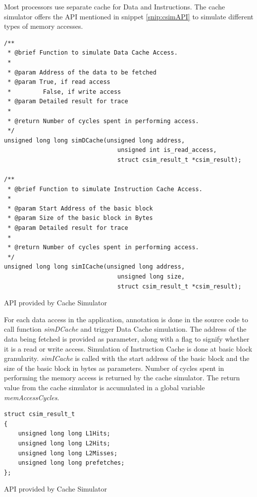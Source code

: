 Most processors use separate cache for Data and Instructions. The cache simulator offers the API mentioned in snippet \ref{snip:csimAPI} to simulate different types of memory accesses.

\vspace*{10pt}
\begin{Snippet}[h]
\begin{lstlisting}[numbers=none]
/**
 * @brief Function to simulate Data Cache Access.
 *
 * @param Address of the data to be fetched
 * @param True, if read access
 *         False, if write access
 * @param Detailed result for trace
 *
 * @return Number of cycles spent in performing access.
 */
unsigned long long simDCache(unsigned long address,
                                unsigned int is_read_access,
                                struct csim_result_t *csim_result);
                                
/**
 * @brief Function to simulate Instruction Cache Access.
 *
 * @param Start Address of the basic block
 * @param Size of the basic block in Bytes
 * @param Detailed result for trace 
 *
 * @return Number of cycles spent in performing access.
 */
unsigned long long simICache(unsigned long address,
                                unsigned long size,
                                struct csim_result_t *csim_result);
\end{lstlisting}
\caption{API provided by Cache Simulator}
\label{snip:csimAPI}
\end{Snippet}

For each data access in the application, annotation is done in the source code to call function \emph{simDCache} and trigger Data Cache simulation. The address of the data being fetched is provided as parameter, along with a flag to signify whether it is a read or write access. Simulation of Instruction Cache is done at basic block granularity. \emph{simICache} is called with the start address of the basic block and the size of the basic block in bytes as parameters. Number of cycles spent in performing the memory access is returned by the cache simulator. The return value from the cache simulator is accumulated in a global variable \emph{memAccessCycles}. 

\vspace*{10pt}
\begin{Snippet}[h]
\begin{lstlisting}[numbers=none]
struct csim_result_t
{
	unsigned long long L1Hits;
	unsigned long long L2Hits;
	unsigned long long L2Misses;
	unsigned long long prefetches;
};
\end{lstlisting}
\caption{API provided by Cache Simulator}
\label{snip:csimAPI}
\end{Snippet}

